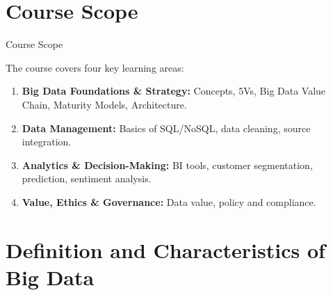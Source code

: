 \documentclass[aspectratio=169, table]{beamer}
\begin{document}
\section{Course Scope}

\begin{frame}[fragile]{Course Scope}
	
	The course covers four key learning areas:
	
	\vspace{4pt}
	\begin{enumerate}
		\item \textbf{Big Data Foundations \& Strategy:} Concepts, 5Vs, Big Data Value Chain, Maturity Models, Architecture.
		\item \textbf{Data Management:} Basics of SQL/NoSQL, data cleaning, source integration.
		\item \textbf{Analytics \& Decision-Making:} BI tools, customer segmentation, prediction, sentiment analysis.
		\item \textbf{Value, Ethics \& Governance:} Data value, policy and compliance.
	\end{enumerate}
\end{frame}


\section{Definition and Characteristics of Big Data}
\end{document}
